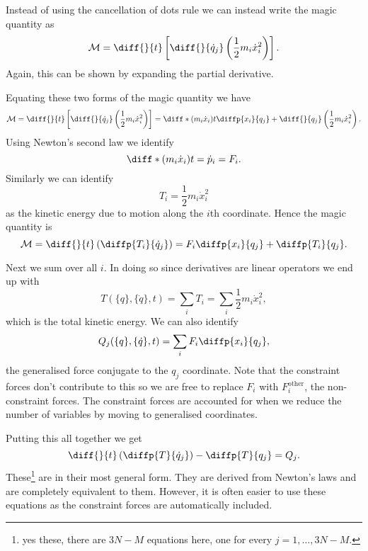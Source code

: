 \documentclass[fleqn]{NotesClass}
\newcommand*{\other}{\mathrm{other}}
\begin{document}
    Instead of using the cancellation of dots rule we can instead write the magic quantity as
    \begin{equation}
        \mathcal{M} = \diff{}{t}\left[ \diff{}{\dot{q}_j} \left( \frac{1}{2}m_i\dot{x}_i^2 \right) \right].
    \end{equation}
    Again, this can be shown by expanding the partial derivative.
    
    Equating these two forms of the magic quantity we have
    \begin{equation}
        \mathcal{M} = \diff{}{t}\left[ \diff{}{\dot{q}_j} \left( \frac{1}{2}m_i\dot{x}_i^2 \right) \right] = \diff*{(m_i\dot{x}_i)}{t}\diffp{x_i}{q_j} + \diff{}{q_j}\left( \frac{1}{2}m_i\dot{x}_i^2 \right).
    \end{equation}
    Using Newton's second law we identify
    \begin{equation}
        \diff*{(m_i\dot{x}_i)}{t} = \dot{p}_i = F_i.
    \end{equation}
    Similarly we can identify
    \begin{equation}
        T_i = \frac{1}{2}m_i\dot{x}_i^2
    \end{equation}
    as the kinetic energy due to motion along the \(i\)th coordinate.
    Hence the magic quantity is
    \begin{equation}
        \mathcal{M} = \diff{}{t}\left( \diffp{T_i}{\dot{q}_j} \right) = F_i\diffp{x_i}{q_j} + \diffp{T_i}{q_j}.
    \end{equation}
    
    Next we sum over all \(i\).
    In doing so since derivatives are linear operators we end up with 
    \begin{equation}
        T(\{q\}, \{\dot{q}\}, t) = \sum_i T_i = \sum_i \frac{1}{2}m_i\dot{x}_i^2,
    \end{equation}
    which is the total kinetic energy.
    We can also identify
    \begin{equation}
        Q_j(\{q\}, \{\dot{q}\}, t) = \sum_i F_i\diffp{x_i}{q_j},
    \end{equation}
    the generalised force conjugate to the \(q_j\) coordinate.
    Note that the constraint forces don't contribute to this so we are free to replace \(F_i\) with \(F_i^{\other}\), the non-constraint forces.
    The constraint forces are accounted for when we reduce the number of variables by moving to generalised coordinates.
    
    Putting this all together we get
    \begin{equation}
        \diff{}{t} \left( \diffp{T}{\dot{q}_j} \right) - \diffp{T}{q_j} = Q_j.
    \end{equation}
    These\footnote{yes these, there are \(3N - M\) equations here, one for every \(j = 1, \dotsc, 3N - M\).} are  in their most general form.
    They are derived from Newton's laws and are completely equivalent to them.
    However, it is often easier to use these equations as the constraint forces are automatically included.
    
\end{document}
